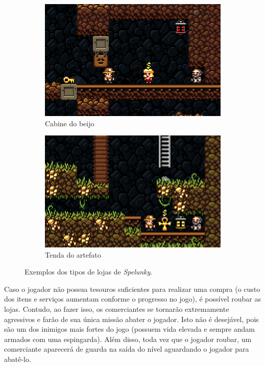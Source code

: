 \begin{figure}[htb!]
	\begin{subfigure}[b]{0.4\textwidth}
		\includegraphics[width=\textwidth]{fig/spelunky-shop-kiss.png}
		\caption{Cabine do beijo}
		\label{fig:spelunky-shop-kiss}
	\end{subfigure}
	\begin{subfigure}[b]{0.4\textwidth}
		\includegraphics[width=\textwidth]{fig/spelunky-shop-ankh.png}
		\caption{Tenda do artefato}
		\label{fig:spelunky-shop-ankh}
	\end{subfigure}
	\caption{Exemplos dos tipos de lojas de \textit{Spelunky}.}
	\label{fig:spelunky-shop-examples}
\end{figure}


Caso o jogador não possua tesouros suficientes para realizar uma compra (o custo
dos itens e serviços aumentam conforme o progresso no jogo), é possível roubar
as lojas. Contudo, ao fazer isso, os comerciantes se tornarão extremamente
agressivos e farão de sua única missão abater o jogador. Isto não é desejável,
pois são um dos inimigos mais fortes do jogo (possuem vida elevada e sempre
andam armados com uma espingarda). Além disso, toda vez que o jogador roubar, um
comerciante aparecerá de guarda na saída do nível aguardando o jogador para
abatê-lo. 


